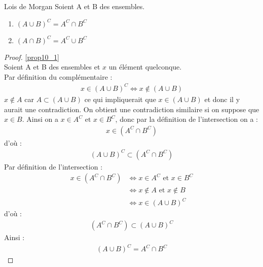 \begin{proposition}{Lois de Morgan} Soient A et B des ensembles.
	\begin{enumerate}
		\item \label{prop10_1} $(A \cup B)^C = A^C \cap B^C$
		\item \label{prop10_2} $(A \cap B)^C = A^C \cup B^C$
	\end{enumerate}
\end{proposition}

\begin{proof}
	\ref{prop10_1} \\
	Soient A et B des ensembles et $x$ un élément quelconque.
	\\
	\framebox{$\subset$}
	Par définition du complémentaire : 
	\begin{align*}
		x \in (A \cup B)^C \iff x \notin (A \cup B)
	\end{align*}
	$x \notin A$ car $A \subset (A \cup B)$ ce qui impliquerait que $x \in (A \cup B)$ et donc il y aurait une contradiction. On obtient une contradiction similaire si on suppose que $x \in B$. Ainsi on a $x \in A^C \text{ et } x \in B^C$, donc par la définition de l'intersection on a :
	\begin{align*}
		x \in (A^C \cap B^C)
	\end{align*}
	d'où :
	\begin{align*}
		(A \cup B)^C \subset (A^C \cap B^C)
	\end{align*}
	\framebox{$\supset$} Par définition de l'intersection :
	\begin{align*}
		x \in (A^C \cap B^C) &\iff x \in A^C \text{ et } x \in B^C \\
		&\iff x \notin A \text{ et } x \notin B \\
		&\iff x \in (A \cup B)^C
	\end{align*}
	d'où :
	\begin{align*}
		(A^C \cap B^C) \subset (A \cup B)^C
	\end{align*}
	Ainsi : 
	\begin{align*}
		(A \cup B)^C = A^C \cap B^C
	\end{align*}
\end{proof}

